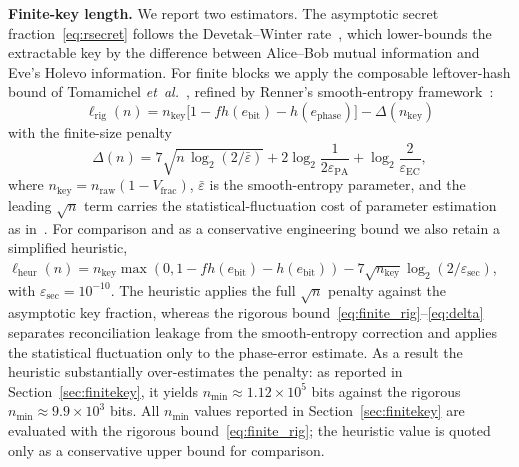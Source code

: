 \documentclass[conference]{IEEEtran}
\begin{document}
\textbf{Finite-key length.} We report two estimators. The asymptotic secret fraction~\eqref{eq:rsecret} follows the Devetak--Winter rate~\cite{devetak2005}, which lower-bounds the extractable key by the difference between Alice--Bob mutual information and Eve's Holevo information. For finite blocks we apply the composable leftover-hash bound of Tomamichel \emph{et~al.}~\cite{tomamichel2012}, refined by Renner's smooth-entropy framework~\cite{renner2008}:
\begin{equation}
\ell_{\mathrm{rig}}(n) = n_{\mathrm{key}}\big[1 - f h(e_{\mathrm{bit}}) - h(e_{\mathrm{phase}})\big] - \Delta(n_{\mathrm{key}}) \label{eq:finite_rig}
\end{equation}
with the finite-size penalty
\begin{equation}
\Delta(n) = 7\sqrt{n\,\log_2(2/\bar{\varepsilon})} + 2\log_2\!\frac{1}{2\varepsilon_{\mathrm{PA}}} + \log_2\!\frac{2}{\varepsilon_{\mathrm{EC}}}, \label{eq:delta}
\end{equation}
where $n_{\mathrm{key}} = n_{\mathrm{raw}}(1 - V_{\mathrm{frac}})$, $\bar\varepsilon$ is the smooth-entropy parameter, and the leading $\sqrt{n}$ term carries the statistical-fluctuation cost of parameter estimation as in~\cite{tomamichel2012,tomamichel2017,hayashi2012}. For comparison and as a conservative engineering bound we also retain a simplified heuristic, $\ell_{\mathrm{heur}}(n) = n_{\mathrm{key}}\max(0, 1 - f h(e_{\mathrm{bit}}) - h(e_{\mathrm{bit}})) - 7\sqrt{n_{\mathrm{key}}}\log_2(2/\varepsilon_{\mathrm{sec}})$, with $\varepsilon_{\mathrm{sec}} = 10^{-10}$. The heuristic applies the full $\sqrt{n}$ penalty against the asymptotic key fraction, whereas the rigorous bound~\eqref{eq:finite_rig}--\eqref{eq:delta} separates reconciliation leakage from the smooth-entropy correction and applies the statistical fluctuation only to the phase-error estimate. As a result the heuristic substantially over-estimates the penalty: as reported in Section~\ref{sec:finitekey}, it yields $n_{\min} \approx 1.12\times10^5$ bits against the rigorous $n_{\min} \approx 9.9\times10^3$ bits. All $n_{\min}$ values reported in Section~\ref{sec:finitekey} are evaluated with the rigorous bound~\eqref{eq:finite_rig}; the heuristic value is quoted only as a conservative upper bound for comparison.
\end{document}
